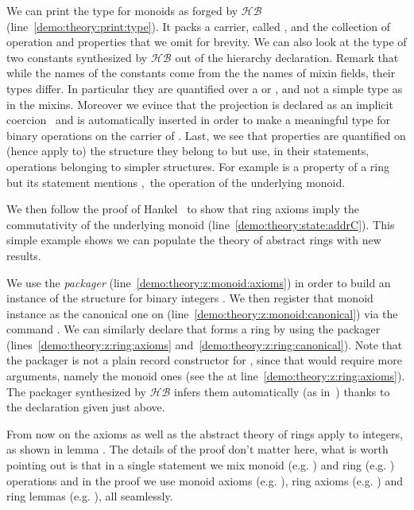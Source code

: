 \documentclass[a4paper,UKenglish,cleveref, autoref]{lipics-v2019}
\newcommand{\HB}{\ensuremath{\mathcal{HB}}}
\newcommand{\mixin}{mixin}
\newcommand{\mixins}{mixins}
\newcommand{\packager}{packager}
\theoremstyle{implem}
\theoremstyle{implem}
\theoremstyle{command}
\begin{document}
We can print the type for monoids as forged by \HB{} (line~\ref{demo:theory:print:type}).
It packs a carrier, called , and the collection of operation and
properties that we omit for brevity.  We can also look at the type of two
constants synthesized by \HB{} out of the hierarchy declaration. Remark that
while the names of the constants come from the the names of \mixin{} fields,
their types differ.
In particular they are quantified over a  or ,
and not a simple type  as in the \mixins{}. Moreover we evince that
the  projection is declared as an implicit coercion~\cite{Saibi97}
and is automatically inserted in order to make  a meaningful
type for binary operations on the carrier of . Last, we see that
properties are quantified on (hence apply to) the structure they belong to but
use, in their statements, operations belonging to simpler structures.
For example  is a property of a ring but  its statement mentions ,\
the operation of the underlying monoid.

We then follow the proof of Hankel~\cite{nearrings} to show that
ring axioms imply the commutativity of the underlying monoid
(line~\ref{demo:theory:state:addrC}). This simple example shows we can
populate the theory of abstract rings with new results.

We use the  \emph{\packager{}}
(line~\ref{demo:theory:z:monoid:axioms})
in order to build an instance of the 
structure for binary integers .
We then register that monoid instance as the canonical one on 
(line~\ref{demo:theory:z:monoid:canonical}) via the command
.
We can similarly declare that  forms a ring by using
the  \packager{}
(lines~\ref{demo:theory:z:ring:axioms} and~\ref{demo:theory:z:ring:canonical}).
Note that the \coq{Ring_of_Monoid.Axioms} \packager{} is not
a plain record constructor for , since that
would require more arguments, namely the monoid ones (see the \coq{_}
at line~\ref{demo:theory:z:ring:axioms}). The
\packager{} synthesized by \HB{} infers them automatically
(as in~\cite[Section 7]{DBLP:conf/itp/MahboubiT13}) thanks to the 
declaration given just above.

From now on the axioms as well as the abstract theory of rings apply to
integers, as shown in lemma \coq{exercise}. The details of the proof
don't matter here, what is worth pointing out is that in a single
statement we mix monoid (e.g. \coq{+}) and ring (e.g. \coq{-}) operations and in the
proof we use monoid axioms (e.g. \coq{addrA}), ring axioms
(e.g. ) and ring lemmas (e.g. ), all seamlessly.
\end{document}

